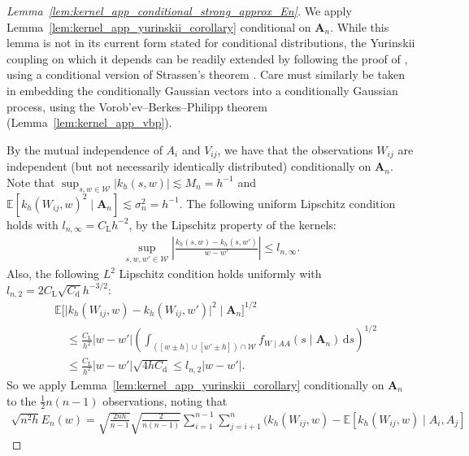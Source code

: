 \documentclass[11pt,lof]{puthesis}
\newcommand{\E}{\ensuremath{\mathbb{E}}}
\newcommand{\rL}{\ensuremath{\mathrm{L}}}
\newcommand{\rd}{\ensuremath{\mathrm{d}}}
\newcommand{\bA}{\ensuremath{\mathbf{A}}}
\newcommand{\cW}{\ensuremath{\mathcal{W}}}
\newcommand{\diff}[1]{\,\mathrm{d}#1}
\theoremstyle{break}
\theoremstyle{proof}
\newtheorem{proof}{Proof}
\begin{document}
\begin{proof}[Lemma~\ref{lem:kernel_app_conditional_strong_approx_En}]

  We apply Lemma~\ref{lem:kernel_app_yurinskii_corollary} conditional on
  $\bA_n$. While this lemma is not in its current form
  stated for conditional distributions,
  the Yurinskii coupling on which it depends can be readily extended
  by following the proof of \citet[Lemma~38]{belloni2019conditional},
  using a conditional version of Strassen's theorem
  \cite[Theorem~B.2]{chen2020jackknife}.
  Care must similarly be taken in embedding the conditionally Gaussian vectors
  into a conditionally Gaussian process, using the
  Vorob'ev--Berkes--Philipp theorem (Lemma~\ref{lem:kernel_app_vbp}).

  By the mutual independence of $A_i$ and $V_{i j}$,
  we have that the observations
  $W_{i j}$ are independent
  (but not necessarily identically distributed)
  conditionally on $\bA_n$.
  Note that
  $\sup_{s,w \in \cW} |k_h(s,w)| \lesssim M_n = h^{-1}$
  and
  $\E[k_h(W_{i j},w)^2 \mid \bA_n] \lesssim \sigma_n^2 = h^{-1}$.
  The following uniform Lipschitz condition holds
  with $l_{n,\infty} = C_\rL h^{-2}$,
  by the Lipschitz property of the kernels:
  \begin{align*}
    \sup_{s,w,w' \in \cW}
    \left|
      \frac{k_h(s, w) - k_h(s, w')}
      {w-w'}
    \right|
    \leq
    l_{n,\infty}.
  \end{align*}
  Also, the following $L^2$ Lipschitz condition holds
  uniformly with $l_{n,2} = 2 C_\rL \sqrt{C_\rd} h^{-3/2}$:
  \begin{align*}
    &\E\big[
      \big|
      k_h(W_{i j}, w) - k_h(W_{i j}, w')
      \big|^2
      \mid \bA_n
    \big]^{1/2} \\
    &\quad\leq
    \frac{C_\rL}{h^2}
    |w-w'|
    \left(
      \int_{([w \pm h] \cup [w' \pm h]) \cap \cW}
      f_{W \mid AA}(s \mid \bA_n)
      \diff{s}
    \right)^{1/2} \\
    &\quad\leq
    \frac{C_\rL}{h^2}
    |w-w'|
    \sqrt{4h C_\rd}
    \leq
    l_{n,2}
    |w-w'|.
  \end{align*}
  So we apply
  Lemma~\ref{lem:kernel_app_yurinskii_corollary}
  conditionally on $\bA_n$
  to the $\frac{1}{2}n(n-1)$ observations,
  noting that
  \begin{align*}
    \sqrt{n^2h} E_n(w)
    =
    \sqrt{\frac{2 n h}{n-1}}
    \sqrt{\frac{2}{n(n-1)}}
    \sum_{i=1}^{n-1}
    \sum_{j=i+1}^{n}
    \Big(
      k_h(W_{i j},w)
      - \E[k_h(W_{i j},w) \mid A_i, A_j]

\end{align*}
\end{proof}
\end{document}
